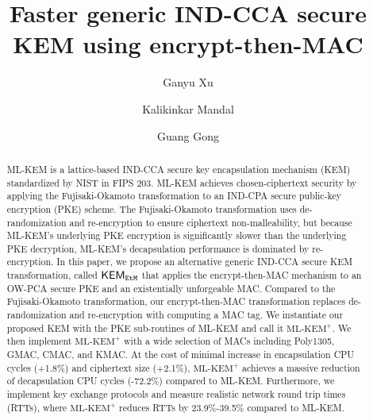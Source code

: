 \documentclass[journal=tches,submission]{iacrtrans}
\author{
    Ganyu Xu\inst{1}
    \and Kalikinkar Mandal\inst{2}
    \and Guang Gong\inst{1}
}
\institute{
  University of Waterloo, Waterloo, Canada, \email{{g66xu,ggong}@uwaterloo.ca}
  \and
  University of New Brunswick, New Brunswick, Canada, \email{kmandal@unb.ca}
}
\title{Faster generic IND-CCA secure KEM using encrypt-then-MAC}
\def\mlkemplus{\text{ML-KEM}^+}
\begin{document}
\maketitle




\begin{abstract}
    ML-KEM is a lattice-based IND-CCA secure key encapsulation mechanism (KEM) standardized by NIST in FIPS 203. ML-KEM achieves chosen-ciphertext security by applying the Fujisaki-Okamoto transformation to an IND-CPA secure public-key encryption (PKE) scheme. The Fujisaki-Okamoto transformation uses de-randomization and re-encryption to ensure ciphertext non-malleability, but because ML-KEM's underlying PKE encryption is significantly slower than the underlying PKE decryption, ML-KEM's decapsulation performance is dominated by re-encryption. In this paper, we propose an alternative generic IND-CCA secure KEM transformation, called ${\sf KEM}_{{\tt EtM}}$ that applies the encrypt-then-MAC mechanism to an OW-PCA secure PKE and an existentially unforgeable MAC. Compared to the Fujisaki-Okamoto transformation, our encrypt-then-MAC transformation replaces de-randomization and re-encryption with computing a MAC tag. 
    We instantiate our proposed KEM with the PKE sub-routines of ML-KEM and call it $\mlkemplus$. We then implement $\mlkemplus$ with a wide selection of MACs including Poly1305, GMAC, CMAC, and KMAC. At the cost of minimal increase in encapsulation CPU cycles (+1.8\%) and ciphertext size (+2.1\%), $\mlkemplus$ achieves a massive reduction of decapsulation CPU cycles (-72.2\%) compared to ML-KEM. Furthermore, we implement key exchange protocols and measure realistic network round trip times (RTTs), where $\mlkemplus$ reduces RTTs by 23.9\%-39.5\% compared to ML-KEM.
\end{abstract}
\end{document}
